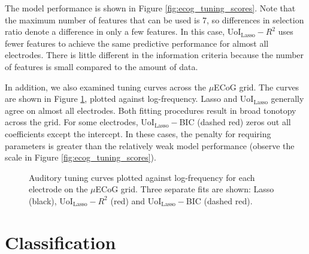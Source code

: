 \documentclass[11pt]{article}
\begin{document}
The model performance is shown in Figure \ref{fig:ecog_tuning_scores}. Note that the maximum number of features that can be used is 7, so differences in selection ratio denote a difference in only a few features. In this case, UoI$_{\text{Lasso}}-R^2$ uses fewer features to achieve the same predictive performance for almost all electrodes. There is little different in the information criteria because the number of features is small compared to the amount of data.

In addition, we also examined tuning curves across the $\mu$ECoG grid. The curves are shown in Figure \ref{fig:ecog_tuning_curves}, plotted against log-frequency. Lasso and UoI$_{\text{Lasso}}$ generally agree on almost all electrodes. Both fitting procedures result in broad tonotopy across the grid. For some electrodes, UoI$_{\text{Lasso}}-$BIC (dashed red) zeros out all coefficients except the intercept. In these cases, the penalty for requiring parameters is greater than the relatively weak model performance (observe the scale in Figure \ref{fig:ecog_tuning_scores}).
\begin{figure}[b!]
	\centering

	\caption{Auditory tuning curves plotted against log-frequency for each electrode on the $\mu$ECoG grid. Three separate fits are shown: Lasso (black), UoI$_{\text{Lasso}}-R^2$ (red) and UoI$_{\text{Lasso}}-$BIC (dashed red).}
	\label{fig:ecog_tuning_curves}
\end{figure}

\section{Classification}
\end{document}
